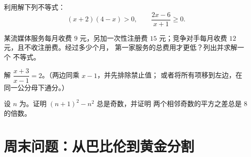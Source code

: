 \begin{exercise}[$\star\star$]\label{exo:g10:algebra:8}
       利用解下列不等式：
\[
(x + 2)(4 - x) > 0,
\qquad
\frac{2x - 6}{x + 1} \geq 0 .
\]
\end{exercise}

\begin{exercise}[$\star\star$]\label{exo:g10:algebra:9}
       某流媒体服务每月收费 $9$ 元，另加一次性注册费
       $15$ 元；竞争对手每月收费 $12$ 元，且不收注册费。经过多少个月，
       第一家服务的总费用才更低？列出并求解一个
       不等式。
\end{exercise}

\begin{exercise}[$\star\star$]\label{exo:g10:algebra:10}
       解 $\dfrac{x+3}{x-1} = 2$。（两边同乘 $x - 1$，并先排除禁止值；
       或者将所有项移到左边，在
       同一公分母下通分。）
\end{exercise}

\begin{exercise}[$\star\star\star$]\label{exo:g10:algebra:11}
       设 $n$ 为。证明 $(n + 1)^2 - n^2$ 总是奇数，并证明
       两个相邻奇数的平方之差总是
       $8$ 的倍数。
\end{exercise}

\section{周末问题：从巴比伦到黄金分割}

